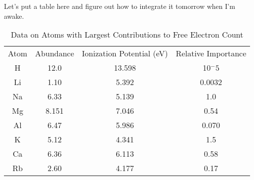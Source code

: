 Let's put a table here and figure out how to integrate it tomorrow when I'm awake.

\begin{table}[h]
\caption{\label{tab:electroncontribution}Data on Atoms with Largest Contributions to Free Electron Count}
\begin{tabular}{c c c c}
Atom & Abundance & Ionization Potential (eV)& Relative Importance\\
H & 12.0 & 13.598 & 10$^-5$\\
Li & 1.10 & 5.392 & 0.0032\\
Na & 6.33 & 5.139 & 1.0 \\
Mg & 8.151 & 7.046 & 0.54\\
Al & 6.47 & 5.986 & 0.070\\
K  & 5.12 & 4.341 & 1.5\\
Ca & 6.36 & 6.113 & 0.58\\
Rb & 2.60 & 4.177 & 0.17\\
\end{tabular}
\end{table}
